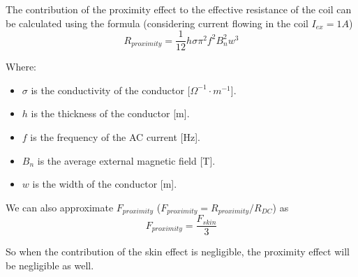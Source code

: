 \begin{itemize}
    The contribution of the proximity effect to the effective resistance of the coil can be calculated using the formula (considering current flowing in the coil $I_{ex} = 1A$) \cite{AC_res_Optimization}
    \begin{equation}
        R_{proximity} = \frac{1}{12} h \sigma \pi^2 f^2 B_n^2 w^3
    \end{equation}
        
    Where:
    \begin{itemize}
        \item \( \sigma \) is the conductivity of the conductor [\(\Omega^{-1} \cdot m^{-1}\)].
        \item \( h \) is the thickness of the conductor [m].
        \item \( f \) is the frequency of the AC current [Hz].
        \item \( B_n \) is the average external magnetic field [T].
        \item \( w \) is the width of the conductor [m].
    \end{itemize}

    We can also approximate $F_{proximity}$ ($F_{proximity} = R_{proximity}/R_{DC}$) as
    \begin{equation}
        F_{proximity} = \frac{F_{skin}}{3}
    \end{equation}

    So when the contribution of the skin effect is negligible, the proximity effect will be negligible as well.

\end{itemize}





